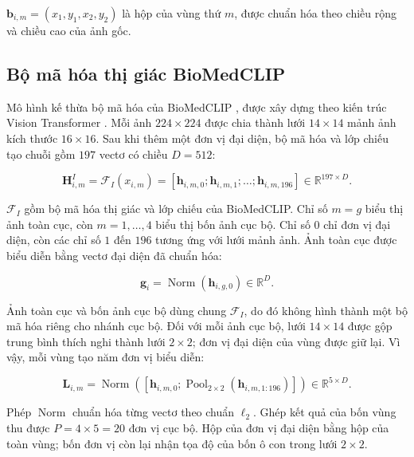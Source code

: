 $\boldsymbol{b}_{i,m}=(x_1,y_1,x_2,y_2)$ là hộp của vùng thứ $m$, được chuẩn hóa theo chiều rộng và chiều cao của ảnh gốc.

\subsection{Bộ mã hóa thị giác BioMedCLIP}
\label{subsec:ch3_visual_encoder}

Mô hình kế thừa bộ mã hóa của BioMedCLIP \cite{BiomedCLIP}, được xây dựng theo kiến trúc Vision Transformer \cite{Dosovitskiy2021ViT}. Mỗi ảnh $224\times224$ được chia thành lưới $14\times14$ mảnh ảnh kích thước $16\times16$. Sau khi thêm một đơn vị đại diện, bộ mã hóa và lớp chiếu tạo chuỗi gồm $197$ vectơ có chiều $D=512$:

\begin{equation}
\boldsymbol{H}_{i,m}^{I}
=\mathcal{F}_{I}\!\left(x_{i,m}\right)
=\left[
\boldsymbol{h}_{i,m,0};
\boldsymbol{h}_{i,m,1};\ldots;
\boldsymbol{h}_{i,m,196}
\right]
\in\mathbb{R}^{197\times D}.
\label{eq:ch3_visual_encoder}
\end{equation}

$\mathcal{F}_{I}$ gồm bộ mã hóa thị giác và lớp chiếu của BioMedCLIP. Chỉ số $m=g$ biểu thị ảnh toàn cục, còn $m=1,\ldots,4$ biểu thị bốn ảnh cục bộ. Chỉ số $0$ chỉ đơn vị đại diện, còn các chỉ số $1$ đến $196$ tương ứng với lưới mảnh ảnh. Ảnh toàn cục được biểu diễn bằng vectơ đại diện đã chuẩn hóa:

\begin{equation}
\boldsymbol{g}_i
=\operatorname{Norm}\!\left(\boldsymbol{h}_{i,g,0}\right)
\in\mathbb{R}^{D}.
\label{eq:ch3_global_visual_embedding}
\end{equation}

Ảnh toàn cục và bốn ảnh cục bộ dùng chung $\mathcal{F}_{I}$, do đó không hình thành một bộ mã hóa riêng cho nhánh cục bộ. Đối với mỗi ảnh cục bộ, lưới $14\times14$ được gộp trung bình thích nghi thành lưới $2\times2$; đơn vị đại diện của vùng được giữ lại. Vì vậy, mỗi vùng tạo năm đơn vị biểu diễn:

\begin{equation}
\boldsymbol{L}_{i,m}
=\operatorname{Norm}\!\left(
\left[
\boldsymbol{h}_{i,m,0};
\operatorname{Pool}_{2\times2}\!\left(
\boldsymbol{h}_{i,m,1:196}
\right)
\right]
\right)
\in\mathbb{R}^{5\times D}.
\label{eq:ch3_local_encoding}
\end{equation}

Phép $\operatorname{Norm}$ chuẩn hóa từng vectơ theo chuẩn $\ell_2$. Ghép kết quả của bốn vùng thu được $P=4\times5=20$ đơn vị cục bộ. Hộp của đơn vị đại diện bằng hộp của toàn vùng; bốn đơn vị còn lại nhận tọa độ của bốn ô con trong lưới $2\times2$.

